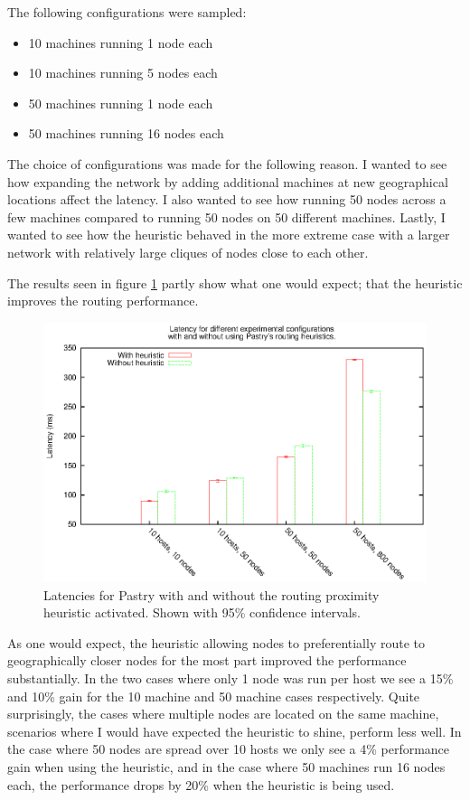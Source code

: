 The following configurations were sampled:
\begin{itemize}
\item 10 machines running 1 node each
\item 10 machines running 5 nodes each
\item 50 machines running 1 node each
\item 50 machines running 16 nodes each
\end{itemize}

The choice of configurations was made for the following reason.
I wanted to see how expanding the network by adding additional machines at new geographical locations affect the latency.
I also wanted to see how running 50 nodes across a few machines compared to running 50 nodes on 50 different machines. Lastly, I wanted to see how the heuristic behaved in the more extreme case with a larger network with relatively large cliques of nodes close to each other.

The results seen in figure \ref{figPastryHeuristic} partly show what one would expect; that the heuristic improves the routing performance.

\begin{figure}[!htb]
  \begin{center}
    \includegraphics[width=0.9\linewidth]{illustrations/pastry_heuristic.eps}
    \caption{Latencies for Pastry with and without the routing proximity heuristic activated. Shown with 95\% confidence intervals.}
    \label{figPastryHeuristic}
  \end{center}
\end{figure}

As one would expect, the heuristic allowing nodes to preferentially route to geographically closer nodes for the most part improved the performance substantially. In the two cases where only 1 node was run per host we see a 15\% and 10\% gain for the 10 machine and 50 machine cases respectively.
Quite surprisingly, the cases where multiple nodes are located on the same machine, scenarios where I would have expected the heuristic to shine, perform less well. In the case where 50 nodes are spread over 10 hosts we only see a 4\% performance gain when using the heuristic, and in the case where 50 machines run 16 nodes each, the performance drops by 20\% when the heuristic is being used.

